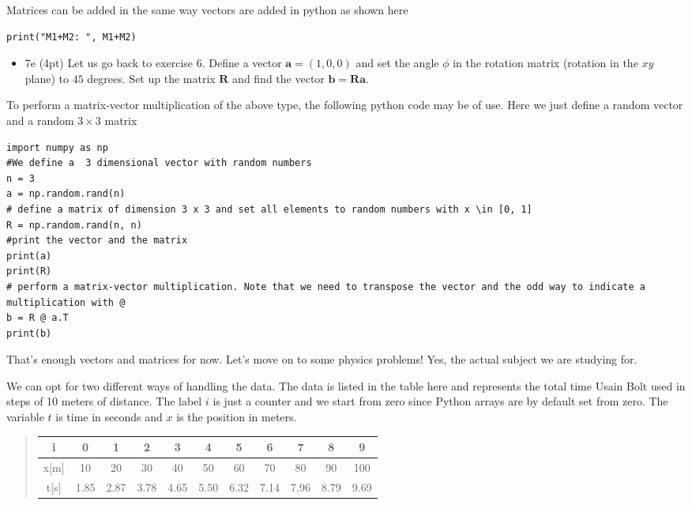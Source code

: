 \documentclass[%
oneside,                 %
final,                   %
10pt]{article}
\begin{document}
Matrices can be added in the same way vectors are added in python as shown here
\begin{verbatim}
print("M1+M2: ", M1+M2)
\end{verbatim}

\begin{itemize}
\item 7e (4pt) Let us go back to exercise 6. Define a vector $\bm{a}=(1,0,0)$ and set the angle $\phi$ in the rotation matrix (rotation in the $xy$ plane) to $45$ degrees. Set up the matrix $\bm{R}$ and find the vector $\bm{b}=\bm{R}\bm{a}$.
\end{itemize}

\noindent
To perform a matrix-vector multiplication of the above type, the following python code may be of use. Here we just define a random vector and a random $3\times 3$ matrix
\begin{verbatim}
import numpy as np
#We define a  3 dimensional vector with random numbers
n = 3
a = np.random.rand(n)
# define a matrix of dimension 3 x 3 and set all elements to random numbers with x \in [0, 1]
R = np.random.rand(n, n)
#print the vector and the matrix
print(a)
print(R)
# perform a matrix-vector multiplication. Note that we need to transpose the vector and the odd way to indicate a multiplication with @
b = R @ a.T
print(b)
\end{verbatim}

That's enough vectors and matrices for now. Let's move on to some physics problems! Yes, the actual subject we are studying for. 

We can opt for two different ways of handling the data. The data is listed in the table here and represents the total time Usain Bolt used in steps of  10 meters of distance. The label $i$ is just a counter and we start from zero since Python arrays are by default set from zero. The variable $t$ is time in seconds and $x$ is the position in meters.


\begin{quote}
\begin{tabular}{ccccccccccc}
\hline
\multicolumn{1}{c}{ i } & \multicolumn{1}{c}{ 0 } & \multicolumn{1}{c}{ 1 } & \multicolumn{1}{c}{ 2 } & \multicolumn{1}{c}{ 3 } & \multicolumn{1}{c}{ 4 } & \multicolumn{1}{c}{ 5 } & \multicolumn{1}{c}{ 6 } & \multicolumn{1}{c}{ 7 } & \multicolumn{1}{c}{ 8 } & \multicolumn{1}{c}{ 9 } \\
\hline
x[m] & 10   & 20   & 30   & 40   & 50   & 60   & 70   & 80   & 90   & 100  \\
\hline
t[s] & 1.85 & 2.87 & 3.78 & 4.65 & 5.50 & 6.32 & 7.14 & 7.96 & 8.79 & 9.69 \\
\hline
\end{tabular}
\end{quote}
\end{document}
